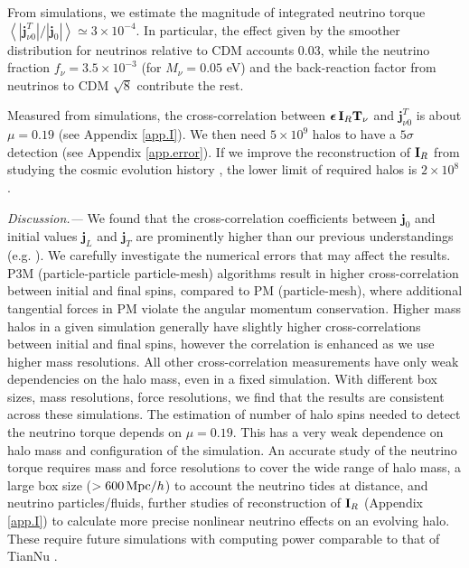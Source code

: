 \documentclass[aps,prd,twocolumn,amsmath,amssymb,amsfont,superscriptaddress,nofootinbib]{revtex4-1}
\newcommand{\bs}{\boldsymbol}
\newcommand{\T}{\bold{T}}
\newcommand{\I}{\bold{I}}
\newcommand{\spin}{\bs{j}}
\begin{document}
From simulations, we estimate the magnitude of integrated neutrino torque $\left\langle|\spin^T_{\nu 0}|/|\spin_0|\right\rangle\simeq 3\times10^{-4}$. In particular, the effect given by the smoother distribution for neutrinos relative to CDM accounts 0.03, while the neutrino fraction $f_\nu=3.5\times 10^{-3}$ (for $M_\nu=0.05$ eV) and the back-reaction factor from neutrinos to CDM $\sqrt{8}$ \citep{2012MNRAS.420.2551B} contribute the rest.

Measured from simulations, the cross-correlation between $\bs{\epsilon}\,\I_R\T_\nu$ and $\spin^T_{\nu 0}$ is about $\mu=0.19$ (see Appendix \ref{app.I}). We then need $5\times 10^9$ halos to have a $5\sigma$ detection (see Appendix \ref{app.error}). If we improve the reconstruction of $\I_R$ from studying the cosmic evolution history \citep{2014ApJ...794...94W}, the lower limit of required halos is $2\times 10^8$.

\textit{Discussion.---}
We found that the cross-correlation coefficients between $\spin_0$ and initial values $\spin_L$ and $\spin_T$ are prominently higher than our previous understandings (e.g. \citep{2000ApJ...532L...5L}). 
We carefully investigate the numerical errors that may affect the results. 
P3M (particle-particle particle-mesh) algorithms result in higher cross-correlation between initial and final spins, compared to PM (particle-mesh), where additional tangential forces in PM violate the angular momentum conservation. 
Higher mass halos in a given simulation generally have slightly higher cross-correlations between initial and final spins, however the correlation is enhanced as we use higher mass resolutions. 
All other cross-correlation measurements have only weak dependencies on the halo mass, even in a fixed simulation. 
With different box sizes, mass resolutions, force resolutions, we find that the results are consistent across these simulations. 
The estimation of number of halo spins needed to detect the neutrino torque depends on $\mu=0.19$. This has a very weak dependence on halo mass and configuration of the simulation. An accurate study of the neutrino torque requires mass and force resolutions to cover the wide range of halo mass, a large box size ($>600\,{\rm Mpc}/h$) to account the neutrino tides at distance, and neutrino particles/fluids, further studies of reconstruction of $\I_R$ (Appendix \ref{app.I}) to calculate more precise nonlinear neutrino effects on an evolving halo. These require future simulations with computing power comparable to that of TianNu \citep{2017RAA....17...85E}.
\end{document}
